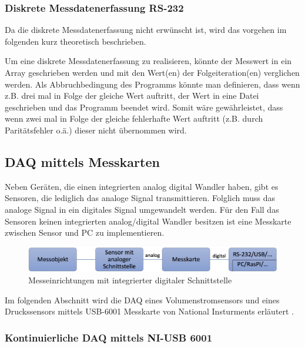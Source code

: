 \subsubsection{Diskrete Messdatenerfassung RS-232}


Da die diskrete Messdatenerfassung nicht erwünscht ist, wird das vorgehen im folgenden kurz theoretisch beschrieben.

Um eine diskrete Messdatenerfassung zu realisieren, könnte der Messwert in ein Array geschrieben werden und mit den Wert(en) der Folgeiteration(en) verglichen werden. Als Abbruchbedingung des Programms könnte man definieren, dass wenn z.B. drei mal in Folge der gleiche Wert auftritt, der Wert in eine Datei geschrieben und das Programm beendet wird. Somit wäre gewährleistet, dass wenn zwei mal in Folge der gleiche fehlerhafte Wert auftritt (z.B. durch Paritätsfehler o.ä.) dieser nicht übernommen wird.

\subsection{DAQ mittels Messkarten}

Neben Geräten, die einen integrierten analog digital Wandler haben, gibt es Sensoren, die lediglich das analoge Signal transmittieren. Folglich muss das analoge Signal in ein digitales Signal umgewandelt werden. Für den Fall das Sensoren keinen integrierten analog/digital Wandler besitzen ist eine Messkarte zwischen Sensor und PC zu implementieren. \\


\begin{figure}[h!] %
\centering
\includegraphics[width=1\textwidth]{Bilder/sensor_analoge_schnittstelle.jpg}
\vspace{0em}
 \caption[Messeinrichtungen mit integrierter digitaler Schnittstelle]{Messeinrichtungen mit integrierter digitaler Schnittstelle}\label{fig:sensor_digitale_schnittstelle}
\end{figure}

Im folgenden Abschnitt wird die DAQ eines Volumenstromsensors und eines Druckssensors mittels USB-6001 Messkarte von National Insturments erläutert .

\subsubsection{Kontinuierliche DAQ mittels NI-USB 6001}



